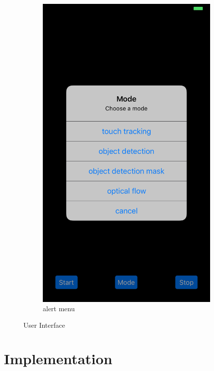\documentclass[11pt,letterpaper]{article}
\begin{document}
\begin{figure}[h!]
\begin{subfigure}{.4\textwidth}
			\includegraphics[width=1\linewidth]{alert_menu}
			\caption{alert menu}
		\end{subfigure}
	    \caption{User Interface}
	\end{figure}
	
	
	\newpage
	\section{Implementation}
	
\end{document}
